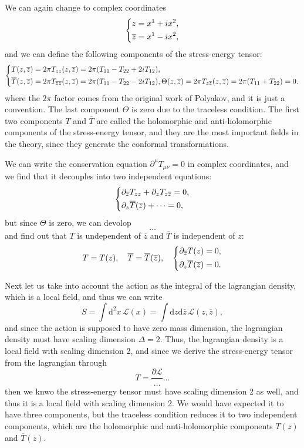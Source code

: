 We can again change to complex coordinates
\[
    \begin{dcases}
        z = x^1 + ix^2, \\
        \overline{z} = x^1 - ix^2,
    \end{dcases}
\]
and we can define the following components of the stress-energy tensor:
\[
    \begin{dcases}
        T(z,\overline{z}) = 2 \pi T_{zz}(z,\overline{z}) = 2 \pi( T_{11} - T_{22} + 2i T_{12} ), \\
        \overline{T}(z,\overline{z}) = 2 \pi T_{\overline{z}\overline{z}}(z,\overline{z}) = 2 \pi( T_{11} - T_{22} - 2i T_{12} ),
        \Theta(z,\overline{z}) = 2 \pi T_{z\overline{z}}(z,\overline{z}) = 2 \pi( T_{11} + T_{22} )=0.
    \end{dcases}
\]
where the \(2\pi\) factor comes from the original work of Polyakov, and it is just a convention. The last component \(\Theta\) is zero due to the traceless condition. The first two components \(T\) and \(\overline{T}\) are called the holomorphic and anti-holomorphic components of the stress-energy tensor, and they are the most important fields in the theory, since they generate the conformal transformations.

We can write the conservation equation \(\partial^\mu T_{\mu\nu} = 0\) in complex coordinates, and we find that it decouples into two independent equations:
\[
    \begin{dcases}
        \partial_{\overline{z}} T_{z z} + \partial_z T_{z\overline{z}} = 0, \\
        \partial_z \overline{T}(\overline{z}) + \dots = 0,
    \end{dcases}
\]
but since \(\Theta\) is zero, we can devolop
\[
    \dots
\]
and find out that \(T\) is undependent of \(\overline{z}\) and \(\overline{T}\) is independent of \(z\):
\[
    T=T(z), \quad \overline{T} = \overline{T}(\overline{z}), \quad \begin{dcases}
        \partial_{\overline{z}} T(z) = 0, \\
        \partial_z \overline{T}(\overline{z}) = 0.
    \end{dcases}
\]

Next let us take into account the action  as the integral of the lagrangian density, which is a local field, and thus we can write
\[
    S = \int \mathrm{d}^2 x \, \mathcal{L}(x) = \int \mathrm{d} z \mathrm{d} \overline{z} \, \mathcal{L}(z, \overline{z}),
\]
and since the action is supposed to have zero mass dimension, the lagrangian density must have scaling dimension \(\Delta = 2\). Thus, the lagrangian density is a local field with scaling dimension 2, and since we derive the stress-energy tensor from the lagrangian through
\[
    T = \frac{\partial \mathcal{L}}{\dots }\dots
\]
then we knwo the stress-energy tensor must have scaling dimension 2 as well, and thus it is a local field with scaling dimension 2. We would have expected it to have three components, but the traceless condition reduces it to two independent components, which are the holomorphic and anti-holomorphic components \(T(z)\) and \(\overline{T}(\overline{z})\).

